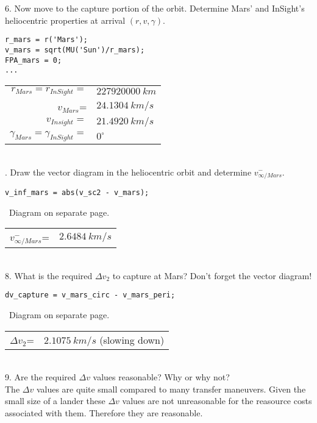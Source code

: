 \documentclass[hidelinks,12pt]{article}
\begin{document}
\vspace{10px}
6. Now move to the capture portion of the orbit. Determine Mars' and InSight's heliocentric properties at arrival $(r,v,\gamma)$.\\
\begin{lstlisting}[frame=lines,style=Matlab-editor,basicstyle = \mlttfamily]
r_mars = r('Mars');
v_mars = sqrt(MU('Sun')/r_mars);
FPA_mars = 0;
...
\end{lstlisting}
\begin{tabular}{rl}
  $r_{Mars}=r_{InSight}=$&$227920000~km$\\
  $v_{Mars}$=&$24.1304~km/s$\\
  $v_{Insight}=$&$21.4920~km/s$\\
  $\gamma_{Mars}=\gamma_{InSight}=$&$0^\circ$\\
\end{tabular}\\
. Draw the vector diagram in the heliocentric orbit and determine $v^-_{\infty/Mars}$.\\
\begin{lstlisting}[frame=lines,style=Matlab-editor,basicstyle = \mlttfamily]
v_inf_mars = abs(v_sc2 - v_mars);
\end{lstlisting}
~Diagram on separate page.\\
\begin{tabular}{rl}
$v^-_{\infty/Mars}$=&$2.6484~km/s$\\
\end{tabular}\\
\vspace{10px}
8. What is the required $\Delta v_2$ to capture at Mars? Don't forget the vector diagram!\\
\begin{lstlisting}[frame=lines,style=Matlab-editor,basicstyle = \mlttfamily]
dv_capture = v_mars_circ - v_mars_peri;
\end{lstlisting}
~Diagram on separate page.\\
\begin{tabular}{rl}
$\Delta v_2$=&$2.1075~km/s$ (slowing down)\\
\end{tabular}\\
\vspace{10px}
9. Are the required $\Delta v$ values reasonable? Why or why not?\\
The $\Delta v$ values are quite small compared to many transfer maneuvers. Given the small size of a lander these $\Delta v$ values are not unreasonable for the reasource costs associated with them. Therefore they are reasonable.
\newpage

\end{document}
